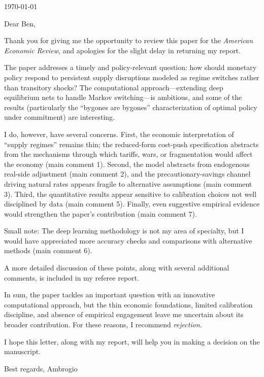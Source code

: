 \documentclass[12pt]{article}
\begin{document}
\thispagestyle{empty}
\setlength{\parindent}{0pt}


\begin{flushright}
	\today
\end{flushright}

\bigskip
\bigskip
\bigskip

Dear Ben,

Thank you for giving me the opportunity to review this paper for the \textit{American Economic Review}, and apologies for the slight delay in returning my report.

The paper addresses a timely and policy-relevant question: how should monetary policy respond to persistent supply disruptions modeled as regime switches rather than transitory shocks? The computational approach---extending deep equilibrium nets to handle Markov switching---is ambitious, and some of the results (particularly the ``bygones are bygones'' characterization of optimal policy under commitment) are interesting.

I do, however, have several concerns. First, the economic interpretation of ``supply regimes'' remains thin; the reduced-form cost-push specification abstracts from the mechanisms through which tariffs, wars, or fragmentation would affect the economy (main comment 1). Second, the model abstracts from endogenous real-side adjustment (main comment 2), and the precautionary-savings channel driving natural rates appears fragile to alternative assumptions \textbf{}(main comment 3). Third, the quantitative results appear sensitive to calibration choices not well disciplined by data (main comment 5). Finally, even suggestive empirical evidence would strengthen the paper's contribution (main comment 7).

Small note: The deep learning methodology is not my area of specialty, but I would have appreciated more accuracy checks and comparisons with alternative methods (main comment 6).

A more detailed discussion of these points, along with several additional comments, is included in my referee report.

In sum, the paper tackles an important question with an innovative computational approach, but the thin economic foundations, limited calibration discipline, and absence of empirical engagement leave me uncertain about its broader contribution. For these reasons, I recommend \textit{rejection}.

I hope this letter, along with my report, will help you in making a decision on the manuscript.

Best regards,\newline
Ambrogio
\end{document}
